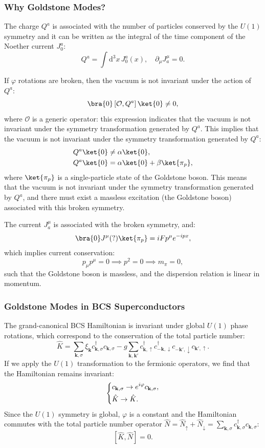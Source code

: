 \subsubsection{Why Goldstone Modes?}

The charge \(Q^a\) is associated with the number of particles conserved by the \(U(1)\) symmetry and it can be written as the integral of the time component of the Noether current \(J_0^a\):
\[
    Q^a = \int \mathrm{d}^3x \, J_0^a(x), \quad \partial_\mu J^\mu_a = 0.
\]

If \(\varphi\) rotations are broken, then the vacuum is not invariant under the action of \(Q^a\):
\[
    \bra{0} \left[\mathcal{O}, Q^a\right] \ket{0} \neq 0,
\]
where \(\mathcal{O}\) is a generic operator: this expression indicates that the vacuum is not invariant under the symmetry transformation generated by \(Q^a\). This implies that the vacuum is not invariant under the symmetry transformation generated by \(Q^a\):
\[
    \begin{aligned}
        Q^a \ket{0} & \neq \alpha \ket{0},                  \\
        Q^a \ket{0} & = \alpha \ket{0} + \beta \ket{\pi_p},
    \end{aligned}
\]
where \(\ket{\pi_p}\) is a single-particle state of the Goldstone boson. This means that the vacuum is not invariant under the symmetry transformation generated by \(Q^a\), and there must exist a massless excitation (the Goldstone boson) associated with this broken symmetry.

The current \(J^\mu_a\) is associated with the broken symmetry, and:
\[
    \bra{0} J^{\mu} (?)\ket{\pi_p} = i F p^\mu e^{-ipx},
\]
which implies current conservation:
\[
    p_\mu p^\mu = 0 \implies p^2 = 0 \implies m_{\pi} = 0,
\]
such that the Goldstone boson is massless, and the dispersion relation is linear in momentum.

\subsubsection{Goldstone Modes in BCS Superconductors}

The grand-canonical BCS Hamiltonian is invariant under global \(U(1)\) phase rotations, which correspond to the conservation of the total particle number:
\[
    \hat{K} = \sum_{\mathbf{k},\sigma} \xi_{\mathbf{k}} c_{\mathbf{k},\sigma}^\dagger c_{\mathbf{k},\sigma} - g \sum_{\mathbf{k},\mathbf{k'}} c_{\mathbf{k},\uparrow}^\dagger c_{-\mathbf{k},\downarrow}^\dagger c_{-\mathbf{k'},\downarrow} c_{\mathbf{k'},\uparrow}.
\]
If we apply the \(U(1)\) transformation to the fermionic operators, we find that the Hamiltonian remains invariant:
\[
    \begin{dcases}
        c_{\mathbf{k},\sigma} \to e^{i\varphi} c_{\mathbf{k},\sigma}, \\
        \hat{K} \to \hat{K}.
    \end{dcases}
\]
Since the \(U(1)\) symmetry is global, \(\varphi\) is a constant and the Hamiltonian commutes with the total particle number operator \(\hat{N} = \hat{N}_\uparrow + \hat{N}_\downarrow = \sum_{\mathbf{k},\sigma} c_{\mathbf{k},\sigma}^\dagger c_{\mathbf{k},\sigma}\):
\[
    [\hat{K}, \hat{N}] = 0.
\]

